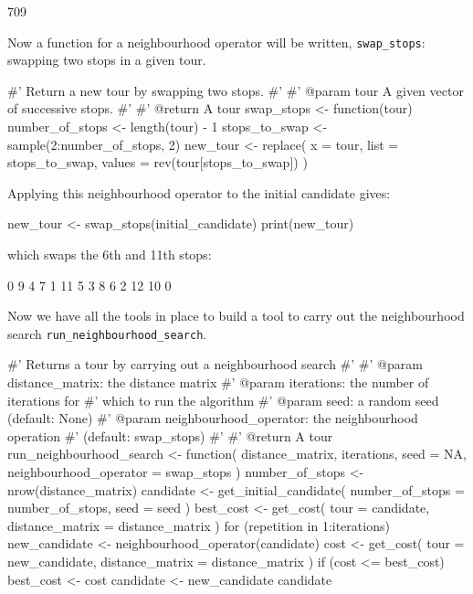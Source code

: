 \begin{Rout}
[1] 709
\end{Rout}

Now a function for a neighbourhood operator will be written,
\texttt{swap_stops}: swapping two stops in a given tour.

\begin{Rin}
#' Return a new tour by swapping two stops.
#'
#' @param tour A given vector of successive stops.
#'
#' @return A tour
swap_stops <- function(tour){
  number_of_stops <- length(tour) - 1
  stops_to_swap <- sample(2:number_of_stops, 2)
  new_tour <- replace(
    x = tour,
    list = stops_to_swap,
    values = rev(tour[stops_to_swap])
  )
}
\end{Rin}

Applying this neighbourhood operator to the initial candidate gives:

\begin{Rin}
new_tour <- swap_stops(initial_candidate)
print(new_tour)
\end{Rin}

which swaps the 6th and 11th stops:

\begin{Rout}
 [1]  0  9  4  7  1 11  5  3  8  6  2 12 10  0
\end{Rout}

Now we have all the tools in place to build a tool to carry out the
neighbourhood search \texttt{run_neighbourhood_search}.

\begin{Rin}
#' Returns a tour by carrying out a neighbourhood search
#'
#' @param distance_matrix: the distance matrix
#' @param iterations: the number of iterations for
#'                    which to run the algorithm
#' @param seed: a random seed (default: None)
#' @param neighbourhood_operator: the neighbourhood operation
#'                                (default: swap_stops)
#'
#' @return A tour
run_neighbourhood_search <- function(
  distance_matrix,
  iterations,
  seed = NA,
  neighbourhood_operator = swap_stops
){
  number_of_stops <- nrow(distance_matrix)
  candidate <- get_initial_candidate(
    number_of_stops = number_of_stops,
    seed = seed
  )
  best_cost <- get_cost(
    tour = candidate,
    distance_matrix = distance_matrix
  )
  for (repetition in 1:iterations) {
    new_candidate <- neighbourhood_operator(candidate)
    cost <- get_cost(
        tour = new_candidate,
        distance_matrix = distance_matrix
    )
    if (cost <= best_cost) {
      best_cost <- cost
      candidate <- new_candidate
    }
  }
  candidate
}
\end{Rin}


